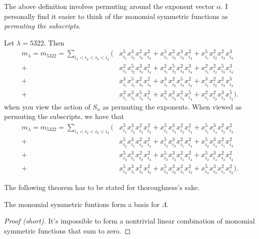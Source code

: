 \documentclass{article}
\begin{document}
The above definition involves permuting around the exponent vector $\alpha$. 
I personally find it easier to think of the monomial symmetric functions as \textit{permuting the subscripts}. 

\begin{example}
    Let $\lambda = 5322$. Then
    \begin{align*}
        m_\lambda = m_{5322} = \sum_{i_1<i_2<i_3<i_4} \Big(&x_{i_1}^5x_{i_2}^3x_{i_3}^2x_{i_4}^2 + x_{i_1}^5x_{i_2}^2x_{i_3}^3x_{i_4}^2 + x_{i_1}^5x_{i_2}^2x_{i_3}^2x_{i_4}^3 \\ 
            + &x_{i_1}^2x_{i_2}^5x_{i_3}^3x_{i_4}^2 + x_{i_1}^2x_{i_2}^5x_{i_3}^2x_{i_4}^3 + x_{i_1}^2x_{i_2}^2x_{i_3}^5x_{i_4}^3  \\
            + &x_{i_1}^3x_{i_2}^5x_{i_3}^2x_{i_4}^2 + x_{i_1}^3x_{i_2}^2x_{i_3}^5x_{i_4}^2 + x_{i_1}^3x_{i_2}^2x_{i_3}^2x_{i_4}^5  \\
        + &x_{i_1}^2x_{i_2}^3x_{i_3}^5x_{i_4}^2 + x_{i_1}^2x_{i_2}^3x_{i_3}^2x_{i_4}^5 + x_{i_1}^2x_{i_2}^2x_{i_3}^3x_{i_4}^5 \Big).
    \end{align*}
    when you view the action of $S_n$ as permuting the exponents. When viewed as permuting the subscripts, we have that
    \begin{align*}
        m_\lambda = m_{5322} = \sum_{i_1<i_2<i_3<i_4} \Big(
        &x_{i_1}^5x_{i_2}^3x_{i_3}^2x_{i_4}^2
        + x_{i_1}^5x_{i_3}^3x_{i_2}^2x_{i_4}^2
        + x_{i_1}^5x_{i_4}^3x_{i_2}^2x_{i_3}^2 \\
        + &x_{i_2}^5x_{i_1}^3x_{i_3}^2x_{i_4}^2
        + x_{i_2}^5x_{i_3}^3x_{i_1}^2x_{i_4}^2
        + x_{i_2}^5x_{i_4}^3x_{i_1}^2x_{i_3}^2 \\
        + &x_{i_3}^5x_{i_1}^3x_{i_2}^2x_{i_4}^2
        + x_{i_3}^5x_{i_2}^3x_{i_1}^2x_{i_4}^2
        + x_{i_3}^5x_{i_4}^3x_{i_2}^2x_{i_4}^2 \\
        + &x_{i_4}^5x_{i_1}^3x_{i_2}^2x_{i_3}^2
        + x_{i_4}^5x_{i_2}^3x_{i_1}^2x_{i_3}^2
        + x_{i_4}^5x_{i_3}^3x_{i_1}^2x_{i_2}^2
    \Big).
    \end{align*}
\end{example}

The following theorem has to be stated for thoroughness's sake.

\begin{theorem}
    The monomial symmetric funtions form a basis for $\Lambda$.
\end{theorem}

\begin{proof}[Proof (short)]
    It's impossible to form a nontrivial linear combination of monomial symmetric functions that sum to zero.
\end{proof}
\end{document}
